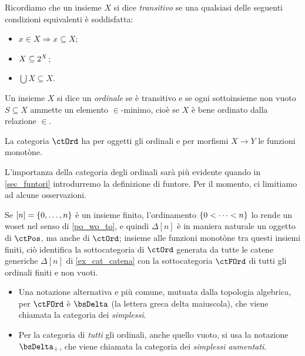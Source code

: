 \begin{example}\label{ex_cat_ordinali}
	Ricordiamo che un insieme \(X\) si dice \emph{transitivo} se una qualsiasi delle seguenti condizioni equivalenti è soddisfatta:
	\begin{itemize}
		\item \(x\in X\Rightarrow x\subseteq X\);
		\item \(X\subseteq 2^{X}\);
		\item \(\bigcup X\subseteq X\).
	\end{itemize}
	Un insieme \(X\) si dice un \emph{ordinale} se è transitivo e se ogni sottoinsieme non vuoto \(S\subseteq X\) ammette un elemento \(\in\)-minimo, cioè se \(X\) è bene ordinato dalla relazione \(\in\).

	La categoria \(\ctOrd\) ha per oggetti gli ordinali e per morfismi \(X\to Y\) le funzioni monotòne.
\end{example}
L'importanza della categoria degli ordinali sarà più evidente quando in \ref{sec_funtori} introdurremo la definizione di funtore. Per il momento, ci limitiamo ad alcune osservazioni.
\begin{remark}\label{rmk_delta_e_deltaPlus}
	Se \([n]=\{\iter[0] n\}\) è un insieme finito, l'ordinamento \(\{\iter[0][<]n\}\) lo rende un woset nel senso di \ref{po_wo_to}, e quindi \(\Delta[n]\) è in maniera naturale un oggetto di \(\ctPos\), ma anche di \(\ctOrd\); insieme alle funzioni monotòne tra questi insiemi finiti, ciò identifica la sottocategoria di \(\ctOrd\) generata da tutte le catene generiche \(\Delta[n]\) di \ref{ex_cat_catena} con la sottocategoria \(\ctFOrd\) di tutti gli ordinali finiti e non vuoti.
	\begin{itemize}
		\item Una notazione alternativa e più comune, mutuata dalla topologia algebrica, per \(\ctFOrd\)	è \(\bsDelta\) (la lettera greca delta maiuscola), che viene chiamata la categoria dei \emph{simplessi}.
		\item Per la categoria di \emph{tutti} gli ordinali, anche quello vuoto, si usa la notazione \(\bsDelta_+\), che viene chiamata la categoria dei \emph{simplessi aumentati}.
	\end{itemize}
\end{remark}
